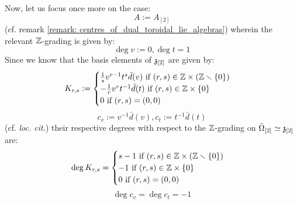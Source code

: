 \begin{remark}
                Now, let us focus once more on the case:
                    $$A := A_{[2]}$$
                (cf. remark \ref{remark: centres_of_dual_toroidal_lie_algebras}) wherein the relevant $\mathbb{Z}$-grading is given by:
                    $$\deg v := 0, \deg t = 1$$
                Since we know that the basis elements of $\mathfrak{z}_{[2]}$ are given by:
                    $$
                        K_{r, s} :=
                        \begin{cases}
                            \text{$\frac1s v^{r - 1} t^s \bar{d}(v)$ if $(r, s) \in \Z \x (\Z \setminus \{0\})$}
                            \\
                            \text{$-\frac1r v^r t^{-1} \bar{d}(t)$ if $(r, s) \in \Z \x \{0\}$}
                            \\
                            \text{$0$ if $(r, s) = (0, 0)$}
                        \end{cases}
                    $$
                    $$c_v := v^{-1} \bar{d}(v), c_t := t^{-1} \bar{d}(t)$$
                (cf. \textit{loc. cit.}) their respective degrees with respect to the $\mathbb{Z}$-grading on $\bar{\Omega}_{[2]} \simeq \mathfrak{z}_{[2]}$ are:
                    $$
                        \deg K_{r, s} =
                        \begin{cases}
                            \text{$s - 1$ if $(r, s) \in \Z \x (\Z \setminus \{0\})$}
                            \\
                            \text{$-1$ if $(r, s) \in \Z \x \{0\}$}
                            \\
                            \text{$0$ if $(r, s) = (0, 0)$}
                        \end{cases}
                    $$
                    $$\deg c_v = \deg c_t = -1$$
            \end{remark}

